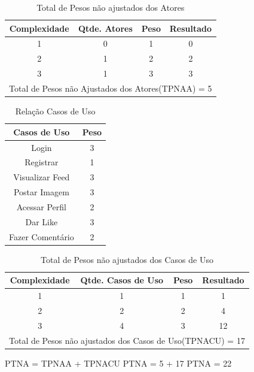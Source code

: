 \begin{table}[!htb]
	\caption[TPNAA]{Total de Pesos não ajustados dos Atores}
	\label{tab:correlacao}
	\centering
	\begin{tabular}{c|c|c|c}
		Complexidade 		 & Qtde. Atores 			& Peso 		 & Resultado	\\ \hline
		1 					 & 0						&	1		 &	  0 	 	\\
		2 					 & 1						&	2		 &	  2 	 	\\
		3 					 & 1						&	3		 &	  3 	 	\\ \hline
		\multicolumn{4}{l}{Total de Pesos não Ajustados dos Atores(TPNAA) = 5}	 	\\
	\end{tabular}
\end{table}

\begin{table}[!htb]
	\caption[Atores]{Relação Casos de Uso}
	\label{tab:correlacao}
	\centering
	\begin{tabular}{c|c}
		Casos de Uso 		& Peso  \\ \hline
		Login       		& 3     \\
		Registrar    		& 1     \\
		Visualizar Feed	& 3     \\
		Postar Imagem		& 3     \\
		Acessar Perfil	& 2     \\
		Dar Like				& 3     \\
		Fazer Comentário	& 2     \\
	\end{tabular}
\end{table}


\begin{table}[!htb]
	\caption[TPNACU]{Total de Pesos não ajustados dos Casos de Uso}
	\label{tab:correlacao}
	\centering
	\begin{tabular}{c|c|c|c}
		Complexidade & Qtde. Casos de Uso & Peso & Resultado	\\ \hline
		1 			 &  		1		  &	1	 &	  1 		\\
		2 			 &  		2		  &	2	 &	  4 		\\
		3 			 &  		4		  &	3	 &	  12 		\\ \hline
		\multicolumn{4}{l}{Total de Pesos não ajustados dos Casos de Uso(TPNACU) = 17} \\
	\end{tabular}
\end{table}

PTNA = TPNAA + TPNACU
PTNA = 5 + 17
PTNA = 22

